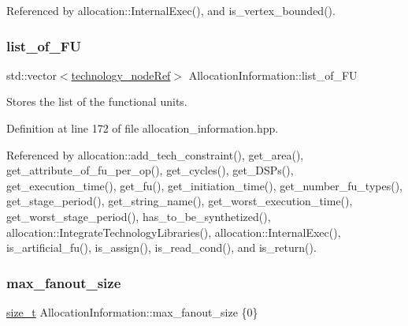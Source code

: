 Referenced by allocation\+::\+Internal\+Exec(), and is\+\_\+vertex\+\_\+bounded().

\mbox{\label{classAllocationInformation_ac92354f2ac838515e25fc32f48cdba1a}} 
\subsubsection{\texorpdfstring{list\+\_\+of\+\_\+\+FU}{list\_of\_FU}}
{\footnotesize\ttfamily std\+::vector$<$\hyperlink{technology__node_8hpp_a33dd193b7bd6b987bf0d8a770a819fa7}{technology\+\_\+node\+Ref}$>$ Allocation\+Information\+::list\+\_\+of\+\_\+\+FU\hspace{0.3cm}{\ttfamily [private]}}



Stores the list of the functional units. 



Definition at line 172 of file allocation\+\_\+information.\+hpp.



Referenced by allocation\+::add\+\_\+tech\+\_\+constraint(), get\+\_\+area(), get\+\_\+attribute\+\_\+of\+\_\+fu\+\_\+per\+\_\+op(), get\+\_\+cycles(), get\+\_\+\+D\+S\+Ps(), get\+\_\+execution\+\_\+time(), get\+\_\+fu(), get\+\_\+initiation\+\_\+time(), get\+\_\+number\+\_\+fu\+\_\+types(), get\+\_\+stage\+\_\+period(), get\+\_\+string\+\_\+name(), get\+\_\+worst\+\_\+execution\+\_\+time(), get\+\_\+worst\+\_\+stage\+\_\+period(), has\+\_\+to\+\_\+be\+\_\+synthetized(), allocation\+::\+Integrate\+Technology\+Libraries(), allocation\+::\+Internal\+Exec(), is\+\_\+artificial\+\_\+fu(), is\+\_\+assign(), is\+\_\+read\+\_\+cond(), and is\+\_\+return().

\mbox{\label{classAllocationInformation_a85587c191fdf7b58d4f7c6df90aa63d1}} 
\subsubsection{\texorpdfstring{max\+\_\+fanout\+\_\+size}{max\_fanout\_size}}
{\footnotesize\ttfamily \hyperlink{tutorial__fpt__2017_2intro_2sixth_2test_8c_a7c94ea6f8948649f8d181ae55911eeaf}{size\+\_\+t} Allocation\+Information\+::max\+\_\+fanout\+\_\+size \{0\}\hspace{0.3cm}{\ttfamily [private]}}



